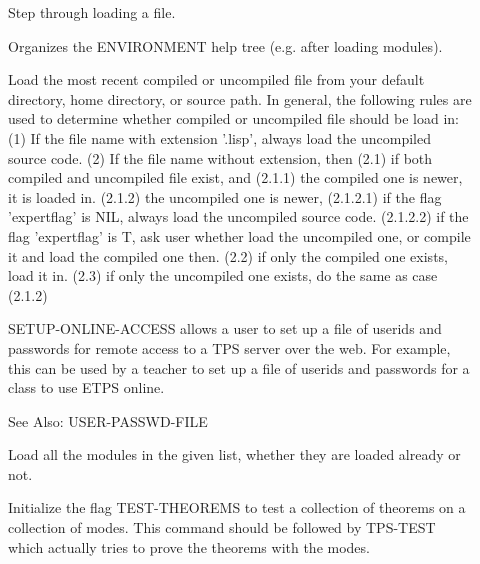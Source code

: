 \begin{description}
\item[\parbox{\textwidth}{LOAD-SLOW \textit{filename}}]  
Step through loading a file.

\item[\parbox{\textwidth}{ORGANIZE}]  
Organizes the ENVIRONMENT help tree (e.g. after loading modules).

\item[\parbox{\textwidth}{QLOAD \textit{filespec}}]  
Load the most recent compiled or uncompiled file from your default
directory, home directory, or source path. In general, the following rules
are used to determine whether compiled or uncompiled file should be load in:
(1) If the file name with extension '.lisp', always load the uncompiled source code.
(2) If the file name without extension, then
    (2.1) if both compiled and uncompiled file exist, and 
          (2.1.1) the compiled one is newer, it is loaded in.
          (2.1.2) the uncompiled one is newer, 
                  (2.1.2.1) if the flag 'expertflag' is NIL, always load the uncompiled 
                            source code.
                  (2.1.2.2) if the flag 'expertflag' is T, ask user whether load the uncompiled
                            one, or compile it and load the compiled one then.
    (2.2) if only the compiled one exists, load it in.
    (2.3) if only the uncompiled one exists, do the same as case (2.1.2)

\item[\parbox{\textwidth}{SETUP-ONLINE-ACCESS}]  
SETUP-ONLINE-ACCESS allows a user to set up a file of userids and passwords
for remote access to a TPS server over the web.  For example, this can
be used by a teacher to set up a file of userids and passwords
for a class to use ETPS online.

See Also: USER-PASSWD-FILE

\item[\parbox{\textwidth}{SYS-LOAD \textit{modulelist}}]  
Load all the modules in the given list, whether they
are loaded already or not.

\item[\parbox{\textwidth}{TEST-INIT}]  
Initialize the flag TEST-THEOREMS to test a collection
of theorems on a collection of modes.  This command should be
followed by TPS-TEST which actually tries to prove the theorems
with the modes.


\end{description}
